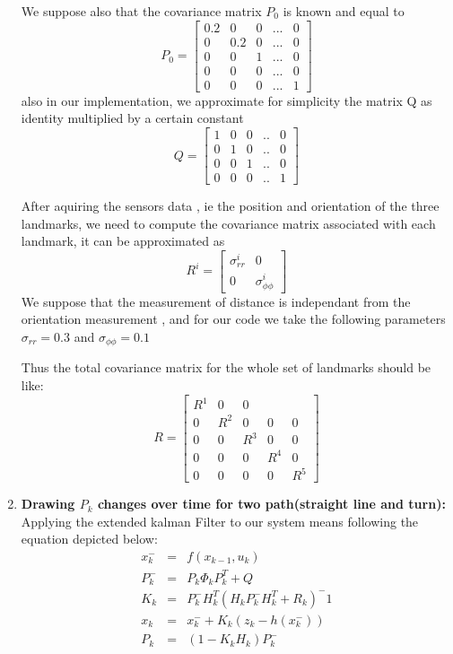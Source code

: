 \documentclass[11pt,a4paper]{report}
\begin{document}
\begin{enumerate}
We suppose also that the covariance matrix $P_{0}$ is known and equal to 
$$P_{0} = \left [ \begin{array}{ccccc} 0.2&0& 0 & ...& 0\\ 0 & 0.2 & 0 & ...& 0\\ 0& 0& 1 & ...& 0 \\ 0& 0& 0 & ...& 0 \\ 0& 0&0  & ...& 1   \end{array}\right ]$$
 also in our implementation, we approximate for simplicity the matrix Q as identity multiplied by a certain constant $$ Q = \left [\begin{array}{cccccc} 1 &0 & 0 &.. & 0\\ 0 & 1 & 0 &.. & 0 \\ 0 & 0 & 1 &.. & 0 \\ 0 & 0 & 0 &.. & 1\end{array}\right ] $$
 
After aquiring the sensors data , ie the position and orientation of the three landmarks, we need to compute the covariance matrix associated with each landmark, it can be approximated as 
$$ R^i = \left [ \begin{array}{cc} \sigma_{rr}^i & 0 \\ 0 & \sigma_{\phi \phi}^i\end{array} \right ] $$
We suppose  that the measurement of distance is independant from the orientation measurement , and for our code we take the following parameters $\sigma_{rr} =0.3 $ and $\sigma_{\phi\phi} = 0.1$ 

Thus the total covariance matrix for the whole set of landmarks should be like:
$$ R = \left [ \begin{array}{ccccc} R^1 & 0 & 0 \\ 0 & R^2 & 0 &0 & 0\\	
0 & 0 & R^3 &0 & 0\\0 & 0 & 0 &R^4  &0 \\ 0 & 0 & 0 & 0& R^5   \end{array} \right ] $$
 
\item \textbf{Drawing $P_{k}$ changes over time for two path(straight line and turn):} 
Applying the extended kalman Filter to our system means following the equation depicted below:
\begin{eqnarray}
x_{k}^- &=& f(x_{k-1}, u_{k}) \label{eq3}\\
P_{k}^- &=& P_{k} \Phi_{k} P_{k}^T  + Q \label{eq4}\\
K_{k} &=& P_{k}^- H_{k}^T (H_{k} P_{k}^-H_{k}^T  + R_{k})^-1 \label{eq5}\\
x_{k} &=& x_{k}^- +K_{k}(z_{k} - h(x_{k}^-)) \label{eq6}\\
P_{k} &=& (1 - K_{k}H_{k} ) P_{k}^-  \label{eq7} 
\end{eqnarray} 
 

\end{enumerate}
\end{document}
